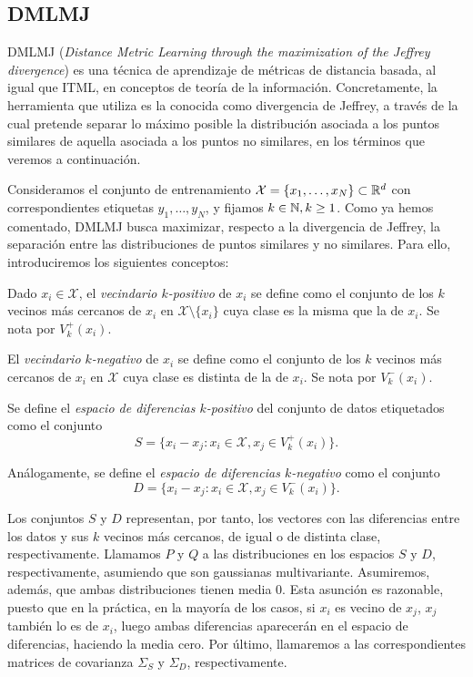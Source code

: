 \subsection{DMLMJ}

DMLMJ (\emph{Distance Metric Learning through the maximization of the Jeffrey divergence}) \cite{dmlmj} es una técnica de aprendizaje de métricas de distancia basada, al igual que ITML, en conceptos de teoría de la información. Concretamente, la herramienta que utiliza es la conocida como divergencia de Jeffrey, a través de la cual pretende separar lo máximo posible la distribución asociada a los puntos similares de aquella asociada a los puntos no similares, en los términos que veremos a continuación.

Consideramos el conjunto de entrenamiento $\mathcal{X} = \{x_1,\dots,x_N\} \subset \mathbb{R}^d$ con correspondientes etiquetas $y_1,\dots,y_N$, y fijamos $k \in \mathbb{N}, k \ge 1$. Como ya hemos comentado, DMLMJ busca maximizar, respecto a la divergencia de Jeffrey, la separación entre las distribuciones de puntos similares y no similares. Para ello, introduciremos los siguientes conceptos:

\begin{definition}
    Dado $x_i \in \mathcal{X}$, el \emph{vecindario $k$-positivo} de $x_i$ se define como el conjunto de los $k$ vecinos más cercanos de $x_i$ en $\mathcal{X} \setminus \{x_i\}$ cuya clase es la misma que la de $x_i$. Se nota por $V_k^+(x_i)$.

    El \emph{vecindario $k$-negativo} de $x_i$ se define como el conjunto de los $k$ vecinos más cercanos de $x_i$ en $\mathcal{X}$ cuya clase es distinta de la de $x_i$. Se nota por $V_k^-(x_i)$.

    Se define el \emph{espacio de diferencias $k$-positivo} del conjunto de datos etiquetados como el conjunto 
    \[ S = \{x_i - x_j \colon x_i \in \mathcal{X}, x_j \in V_k^+(x_i)\}. \]

    Análogamente, se define el \emph{espacio de diferencias $k$-negativo} como el conjunto
    \[ D = \{x_i - x_j \colon x_i \in \mathcal{X}, x_j \in V_k^-(x_i)\}. \]

\end{definition}

Los conjuntos $S$ y $D$ representan, por tanto, los vectores con las diferencias entre los datos y sus $k$ vecinos más cercanos, de igual o de distinta clase, respectivamente. Llamamos $P$ y $Q$ a las distribuciones en los espacios $S$ y $D$, respectivamente, asumiendo que son gaussianas multivariante. Asumiremos, además, que ambas distribuciones tienen media 0. Esta asunción es razonable, puesto que en la práctica, en la mayoría de los casos, si $x_i$ es vecino de $x_j$, $x_j$ también lo es de $x_i$, luego ambas diferencias aparecerán en el espacio de diferencias, haciendo la media cero. Por último, llamaremos a las correspondientes matrices de covarianza $\Sigma_S$ y $\Sigma_D$, respectivamente.

